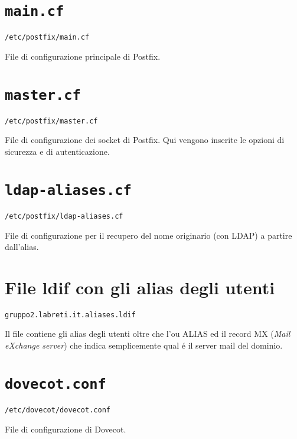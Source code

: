 \documentclass[9pt, a4paper, oneside]{article}
\begin{document}
		\section{\texttt{main.cf}}
			\par
				\texttt{/etc/postfix/main.cf}
			\par
				File di configurazione principale di Postfix.
			\texttt{}
			\newpage
		\section{\texttt{master.cf}}
			\par
				\texttt{/etc/postfix/master.cf}
			\par
				File di configurazione dei socket di Postfix. 
				Qui vengono inserite le opzioni di sicurezza e 
				di autenticazione.
			\texttt{}
			\newpage
		\section{\texttt{ldap-aliases.cf}}
			\par
				\texttt{/etc/postfix/ldap-aliases.cf}
			\par
				File di configurazione per il recupero del 
				nome originario (con LDAP) a partire 
				dall'alias.
			\texttt{}
			\newpage
		\section{File ldif con gli alias degli utenti}
			\par
				\texttt{gruppo2.labreti.it.aliases.ldif}
			\par
				Il file contiene gli alias degli utenti oltre 
				che l'ou ALIAS ed il record MX 
				(\emph{Mail eXchange server}) che indica 
				semplicemente qual \'e il server mail del 
				dominio.
			\texttt{}
			\newpage		
		\section{\texttt{dovecot.conf}}
			\par
				\texttt{/etc/dovecot/dovecot.conf}
			\par
				File di configurazione di Dovecot.
			\texttt{}
			\newpage
\end{document}
